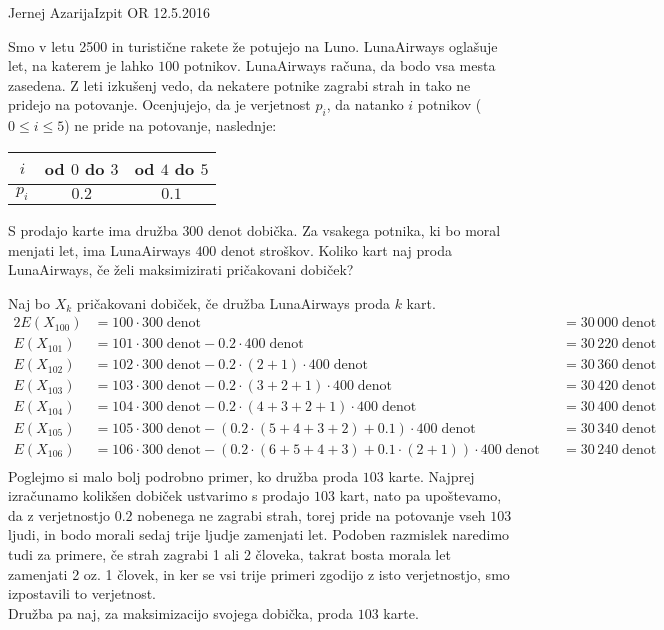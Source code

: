 \begin{naloga}{Jernej Azarija}{Izpit OR 12.5.2016}
\begin{vprasanje}
Smo v letu 2500 in turistične rakete že potujejo na Luno.
LunaAirways oglašuje let, na katerem je lahko $100$ potnikov.
LunaAirways računa, da bodo vsa mesta zasedena.
Z leti izkušenj vedo,
da nekatere potnike zagrabi strah in tako ne pridejo na potovanje.
Ocenjujejo, da je verjetnost $p_i$,
da natanko $i$ potnikov ($0 \le i \le 5$) ne pride na potovanje,
naslednje:
\begin{center}
\begin{tabular}{c|cc}
$i$ & od $0$ do $3$ & od $4$ do $5$ \\ \hline
$p_i$ & $0.2$ & $0.1$
\end{tabular}
\end{center}

S prodajo karte ima družba $300$ denot dobička.
Za vsakega potnika, ki bo moral menjati let,
ima LunaAirways $400$ denot stroškov.
Koliko kart naj proda LunaAirways, če želi maksimizirati pričakovani dobiček?
\end{vprasanje}

\begin{odgovor}
    Naj bo $X_k$ pričakovani dobiček, če družba LunaAirways proda $k$ kart.\\
    \begin{alignat*}{2}
        E(X_{100}) &= 100 \cdot 300\;\text{denot} &&= 30\,000\;\text{denot} \\
        E(X_{101}) &= 101 \cdot 300\;\text{denot} - 0.2 \cdot 400\;\text{denot} &&= 30\,220\;\text{denot}\\
        E(X_{102}) &= 102 \cdot 300\;\text{denot} - 0.2 \cdot (2+1) \cdot 400\;\text{denot} &&= 30\,360\;\text{denot}\\
        E(X_{103}) &= 103 \cdot 300\;\text{denot} - 0.2 \cdot (3+2+1) \cdot 400\;\text{denot} &&= 30\,420\;\text{denot}\\
        E(X_{104}) &= 104 \cdot 300\;\text{denot} - 0.2 \cdot (4+3+2+1) \cdot 400\;\text{denot} &&= 30\,400\;\text{denot}\\
        E(X_{105}) &= 105 \cdot 300\;\text{denot} - (0.2 \cdot (5+4+3+2) + 0.1) \cdot 400\;\text{denot} &&= 30\,340\;\text{denot}\\
        E(X_{106}) &= 106 \cdot 300\;\text{denot} - (0.2 \cdot (6+5+4+3) + 0.1 \cdot (2+1)) \cdot 400\;\text{denot}&&= 30\,240\;\text{denot}\\
    \end{alignat*}
Poglejmo si malo bolj podrobno primer, ko družba proda $103$ karte.
Najprej izračunamo kolikšen dobiček ustvarimo s prodajo $103$ kart, nato pa upoštevamo, da z verjetnostjo $0.2$ nobenega ne zagrabi strah,
torej pride na potovanje vseh $103$ ljudi, in bodo morali sedaj trije ljudje zamenjati let. Podoben razmislek naredimo tudi za primere, če strah zagrabi
1 ali 2 človeka, takrat bosta morala let zamenjati 2 oz. 1 človek, in ker se vsi trije primeri zgodijo z isto verjetnostjo, smo izpostavili to verjetnost.\\
Družba pa naj, za maksimizacijo svojega dobička, proda $103$ karte.
\end{odgovor}
\end{naloga}
